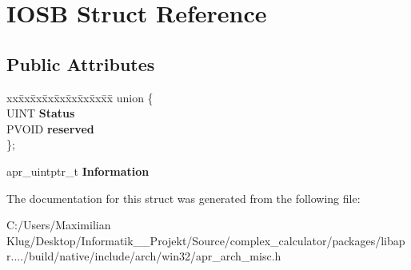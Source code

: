 \hypertarget{struct_i_o_s_b}{}\section{I\+O\+SB Struct Reference}
\label{struct_i_o_s_b}
\subsection*{Public Attributes}
\begin{DoxyCompactItemize}
\item 
\mbox{\label{struct_i_o_s_b_a867a715dcdf23cb51a7b78385d2a29e3}} 
\begin{tabbing}
xx\=xx\=xx\=xx\=xx\=xx\=xx\=xx\=xx\=\kill
union \{\\
\>UINT {\bfseries Status}\\
\>PVOID {\bfseries reserved}\\
\}; \\

\end{tabbing}\item 
\mbox{\label{struct_i_o_s_b_a1c8dfe078826b45807192e0a81211213}} 
apr\+\_\+uintptr\+\_\+t {\bfseries Information}
\end{DoxyCompactItemize}


The documentation for this struct was generated from the following file\+:\begin{DoxyCompactItemize}
\item 
C\+:/\+Users/\+Maximilian Klug/\+Desktop/\+Informatik\+\_\+\_\+\+Projekt/\+Source/complex\+\_\+calculator/packages/libapr..../build/native/include/arch/win32/apr\+\_\+arch\+\_\+misc.\+h\end{DoxyCompactItemize}
